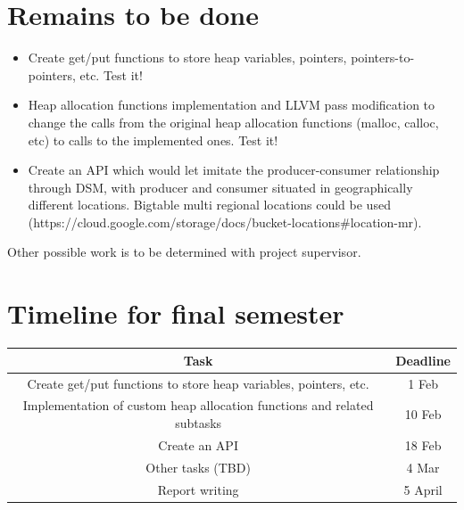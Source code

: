 \documentclass[bsc,frontabs,twoside,singlespacing,parskip,deptreport]{infthesis}     %
\begin{document}
\section{Remains to be done}

\begin{itemize}
\item
Create get/put functions to store heap variables, pointers, pointers-to-pointers, etc. Test it!
\item
Heap allocation functions implementation and LLVM pass modification to change the calls from the original heap allocation functions (malloc, calloc, etc) to calls to the implemented ones. Test it!
\item
Create an API which would let imitate the producer-consumer relationship through DSM, with producer and consumer situated in geographically different locations. Bigtable multi regional locations could be used (https://cloud.google.com/storage/docs/bucket-locations\#location-mr).
\end{itemize}

Other possible work is to be determined with project supervisor.

\section{Timeline for final semester}

\begin{tabular} { | c | c | }
	\hline
 		Task & Deadline \\ [0.5ex] 
	\hline
	\hline
	Create get/put functions to store heap variables, pointers, etc. & 1 Feb \\
	\hline
	Implementation of custom heap allocation functions and related subtasks & 10 Feb \\
	\hline
	Create an API & 18 Feb \\
	\hline
	Other tasks (TBD) & 4 Mar \\
	\hline
	Report writing & 5 April \\
	\hline
\end{tabular}



\end{document}
